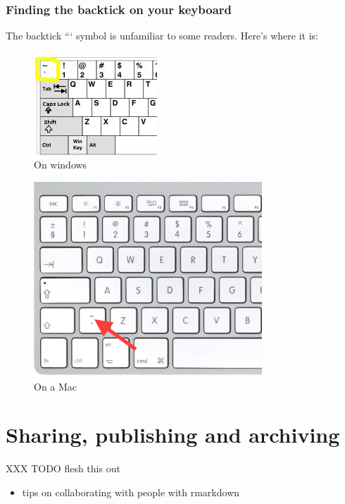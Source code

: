 \documentclass[]{article}
\providecommand{\tightlist}{%
  \setlength{\itemsep}{0pt}\setlength{\parskip}{0pt}}
\theoremstyle{definition}
\theoremstyle{definition}
\theoremstyle{definition}
\theoremstyle{remark}
\begin{document}
\hypertarget{backtick-location}{\subsubsection*{Finding the backtick on
your keyboard}\label{backtick-location}}

The backtick ``` symbol is unfamiliar to some readers. Here's where it
is:

\begin{figure}
\centering
\includegraphics{media/backtick-windows-uk.png}
\caption{On windows}
\end{figure}

\begin{figure}
\centering
\includegraphics{media/backtick-mac-uk.png}
\caption{On a Mac}
\end{figure}

\hypertarget{sharing-and-publication}{\section{Sharing, publishing and
archiving}\label{sharing-and-publication}}

XXX TODO flesh this out

\begin{itemize}
\tightlist
\item
  tips on collaborating with people with rmarkdown
\end{itemize}
\end{document}
